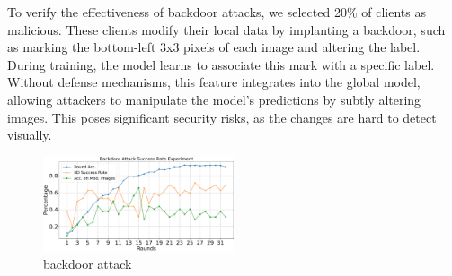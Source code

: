 \documentclass[conference]{IEEEtran}
\def\figBackdoorAttack{0.5\textwidth}
\begin{document}
To verify the effectiveness of backdoor attacks, we selected 20\% of clients as malicious. These clients modify their local data by implanting a backdoor, such as marking the bottom-left 3x3 pixels of each image and altering the label. During training, the model learns to associate this mark with a specific label. Without defense mechanisms, this feature integrates into the global model, allowing attackers to manipulate the model's predictions by subtly altering images. This poses significant security risks, as the changes are hard to detect visually.

\begin{figure}[htbp]
    \centerline{\includegraphics[width=\figBackdoorAttack]{pics/003-backdoorAttack.pdf}}
    \caption{backdoor attack}
    \label{fig:backdoorAttack}
\end{figure}

\end{document}
